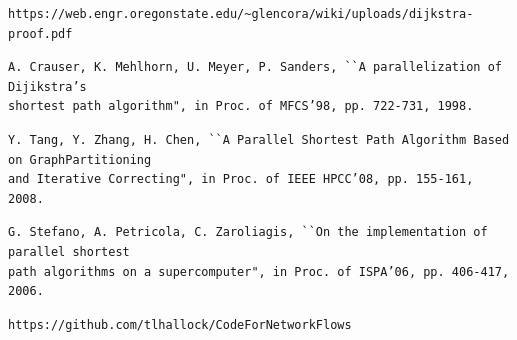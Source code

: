 \documentclass{article}
\begin{document}
\begin{thebibliography}{9}
\begin{verbatim}
https://web.engr.oregonstate.edu/~glencora/wiki/uploads/dijkstra-proof.pdf
\end{verbatim}

\begin{verbatim}
A. Crauser, K. Mehlhorn, U. Meyer, P. Sanders, ``A parallelization of Dijikstra’s
shortest path algorithm", in Proc. of MFCS’98, pp. 722-731, 1998.
\end{verbatim}


\begin{verbatim}
Y. Tang, Y. Zhang, H. Chen, ``A Parallel Shortest Path Algorithm Based on GraphPartitioning
and Iterative Correcting", in Proc. of IEEE HPCC’08, pp. 155-161,
2008.
\end{verbatim}

\begin{verbatim}
G. Stefano, A. Petricola, C. Zaroliagis, ``On the implementation of parallel shortest
path algorithms on a supercomputer", in Proc. of ISPA’06, pp. 406-417, 2006.
\end{verbatim}

\begin{verbatim}
https://github.com/tlhallock/CodeForNetworkFlows
\end{verbatim}

\end{thebibliography}
\end{document}
